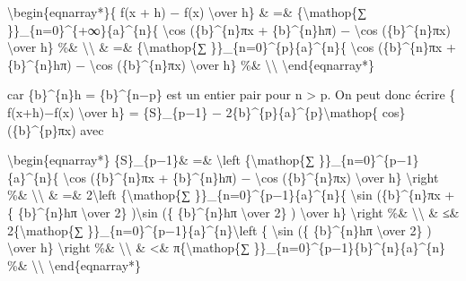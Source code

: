 \documentclass[]{article}
\begin{document}
\textbackslash{}begin\{eqnarray*\}\{ f(x + h) − f(x)
\textbackslash{}over h\} \& =\& \{\textbackslash{}mathop\{∑
\}\}\_\{n=0\}\^{}\{+∞\}\{a\}\^{}\{n\}\{ \textbackslash{}cos
(\{b\}\^{}\{n\}πx + \{b\}\^{}\{n\}hπ) − \textbackslash{}cos
(\{b\}\^{}\{n\}πx) \textbackslash{}over h\} \%\&
\textbackslash{}\textbackslash{} \& =\& \{\textbackslash{}mathop\{∑
\}\}\_\{n=0\}\^{}\{p\}\{a\}\^{}\{n\}\{ \textbackslash{}cos
(\{b\}\^{}\{n\}πx + \{b\}\^{}\{n\}hπ) − \textbackslash{}cos
(\{b\}\^{}\{n\}πx) \textbackslash{}over h\} \%\&
\textbackslash{}\textbackslash{} \textbackslash{}end\{eqnarray*\}

car \{b\}\^{}\{n\}h = \{b\}\^{}\{n−p\} est un entier pair pour n
\textgreater{} p. On peut donc écrire \{ f(x+h)−f(x)
\textbackslash{}over h\} = \{S\}\_\{p−1\} −
2\{b\}\^{}\{p\}\{a\}\^{}\{p\}\textbackslash{}mathop\{ cos\}
(\{b\}\^{}\{p\}πx) avec

\textbackslash{}begin\{eqnarray*\} \textbar{}\{S\}\_\{p−1\}\textbar{}\&
=\& \textbackslash{}left \textbar{}\{\textbackslash{}mathop\{∑
\}\}\_\{n=0\}\^{}\{p−1\}\{a\}\^{}\{n\}\{ \textbackslash{}cos
(\{b\}\^{}\{n\}πx + \{b\}\^{}\{n\}hπ) − \textbackslash{}cos
(\{b\}\^{}\{n\}πx) \textbackslash{}over h\} \textbackslash{}right
\textbar{}\%\& \textbackslash{}\textbackslash{} \& =\&
2\textbackslash{}left \textbar{}\{\textbackslash{}mathop\{∑
\}\}\_\{n=0\}\^{}\{p−1\}\{a\}\^{}\{n\}\{ \textbackslash{}sin
(\{b\}\^{}\{n\}πx +\{ \{b\}\^{}\{n\}hπ \textbackslash{}over 2\}
)\textbackslash{}sin (\{ \{b\}\^{}\{n\}hπ \textbackslash{}over 2\} )
\textbackslash{}over h\} \textbackslash{}right \textbar{} \%\&
\textbackslash{}\textbackslash{} \& ≤\& 2\{\textbackslash{}mathop\{∑
\}\}\_\{n=0\}\^{}\{p−1\}\{a\}\^{}\{n\}\textbackslash{}left \textbar{}\{
\textbackslash{}sin (\{ \{b\}\^{}\{n\}hπ \textbackslash{}over 2\} )
\textbackslash{}over h\} \textbackslash{}right \textbar{} \%\&
\textbackslash{}\textbackslash{} \& \textless{}\&
π\{\textbackslash{}mathop\{∑
\}\}\_\{n=0\}\^{}\{p−1\}\{b\}\^{}\{n\}\{a\}\^{}\{n\} \%\&
\textbackslash{}\textbackslash{} \textbackslash{}end\{eqnarray*\}
\end{document}
